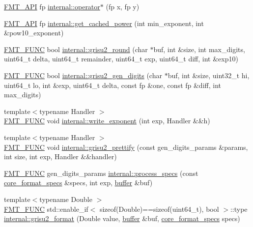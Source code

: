 \begin{DoxyCompactItemize}
\item 
\hyperlink{core_8h_a9a4960b70582ed2620911a0b75dce0b5}{F\+M\+T\+\_\+\+A\+PI} fp \hyperlink{namespaceinternal_a2142ade7c615c7cd113144896aed15c8}{internal\+::operator$\ast$} (fp x, fp y)
\item 
\hyperlink{core_8h_a9a4960b70582ed2620911a0b75dce0b5}{F\+M\+T\+\_\+\+A\+PI} fp \hyperlink{namespaceinternal_aeafc6f6fcfd4e798c6bde994828330e6}{internal\+::get\+\_\+cached\+\_\+power} (int min\+\_\+exponent, int \&pow10\+\_\+exponent)
\item 
\hyperlink{format_8h_a02c8898388e0ae59aab58be14fcd4e05}{F\+M\+T\+\_\+\+F\+U\+NC} bool \hyperlink{namespaceinternal_afc76db0ad587455f6942b74d175ee56a}{internal\+::grisu2\+\_\+round} (char $\ast$buf, int \&size, int max\+\_\+digits, uint64\+\_\+t delta, uint64\+\_\+t remainder, uint64\+\_\+t exp, uint64\+\_\+t diff, int \&exp10)
\item 
\hyperlink{format_8h_a02c8898388e0ae59aab58be14fcd4e05}{F\+M\+T\+\_\+\+F\+U\+NC} bool \hyperlink{namespaceinternal_a654d8a0809bb6e5db2deacf15b2971a2}{internal\+::grisu2\+\_\+gen\+\_\+digits} (char $\ast$buf, int \&size, uint32\+\_\+t hi, uint64\+\_\+t lo, int \&exp, uint64\+\_\+t delta, const fp \&one, const fp \&diff, int max\+\_\+digits)
\item 
{\footnotesize template$<$typename Handler $>$ }\\\hyperlink{format_8h_a02c8898388e0ae59aab58be14fcd4e05}{F\+M\+T\+\_\+\+F\+U\+NC} void \hyperlink{namespaceinternal_a580207e19bc8ef3c099ccc3154f1e8d6}{internal\+::write\+\_\+exponent} (int exp, Handler \&\&h)
\item 
{\footnotesize template$<$typename Handler $>$ }\\\hyperlink{format_8h_a02c8898388e0ae59aab58be14fcd4e05}{F\+M\+T\+\_\+\+F\+U\+NC} void \hyperlink{namespaceinternal_a868ca3301073105fcbd25d79ff98ca16}{internal\+::grisu2\+\_\+prettify} (const gen\+\_\+digits\+\_\+params \&params, int size, int exp, Handler \&\&handler)
\item 
\hyperlink{format_8h_a02c8898388e0ae59aab58be14fcd4e05}{F\+M\+T\+\_\+\+F\+U\+NC} gen\+\_\+digits\+\_\+params \hyperlink{namespaceinternal_ae7e379764ed4a98f3058130ffbca218a}{internal\+::process\+\_\+specs} (const \hyperlink{structcore__format__specs}{core\+\_\+format\+\_\+specs} \&specs, int exp, \hyperlink{printf_8h_ae986769e0053f875cd11c9fa4d22c8a8}{buffer} \&buf)
\item 
{\footnotesize template$<$typename Double $>$ }\\\hyperlink{format_8h_a02c8898388e0ae59aab58be14fcd4e05}{F\+M\+T\+\_\+\+F\+U\+NC} std\+::enable\+\_\+if$<$ sizeof(Double)==sizeof(uint64\+\_\+t), bool $>$\+::type \hyperlink{namespaceinternal_a2cba199f690b1f46cbf62c8e9e2786bc}{internal\+::grisu2\+\_\+format} (Double value, \hyperlink{printf_8h_ae986769e0053f875cd11c9fa4d22c8a8}{buffer} \&buf, \hyperlink{structcore__format__specs}{core\+\_\+format\+\_\+specs} specs)

\end{DoxyCompactItemize}
